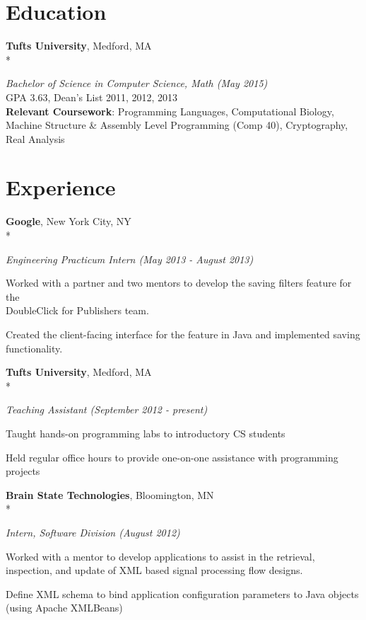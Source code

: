 \documentclass{article}
\newcommand{\position}[2]{
  \textit{#1 (#2)}
}
\newcommand{\affiliation}[2]{
  \textbf{#1}, #2 \\*
}
\newenvironment{achievements}{
  \begin{compactitem} }{
  \end{compactitem}
}
\newcommand{\skill}[2]{
  \textbf{#1}: #2
}
\begin{document}
\section*{Education}
  \affiliation{Tufts University}                             {Medford, MA}
    \position{Bachelor of Science in Computer Science, Math} {May 2015} \\
  GPA 3.63, Dean's List 2011, 2012, 2013 \\
  \skill{Relevant Coursework}
        {Programming Languages, Computational Biology, Machine Structure \&
        Assembly Level Programming (Comp 40), Cryptography, Real Analysis}

\section*{Experience}
  \affiliation{Google}                       {New York City, NY}
    \position {Engineering Practicum Intern} {May 2013 - August 2013}
    \begin{achievements}
      \item Worked with a partner and two mentors to develop the 
            saving filters feature for the \\ DoubleClick for Publishers team.
      \item Created the client-facing interface for the feature in
            Java and implemented saving \\ functionality.
    \end{achievements}
    \smallskip

  \affiliation{Tufts University}   {Medford, MA}
    \position {Teaching Assistant} {September 2012 - present}
    \begin{achievements}
      \item Taught hands-on programming labs to introductory CS students
      \item Held regular office hours to provide one-on-one assistance with
            programming projects
    \end{achievements}
    \smallskip

  \affiliation{Brain State Technologies}  {Bloomington, MN}
    \position {Intern, Software Division} {August 2012}
    \begin{achievements}
      \item Worked with a mentor to develop applications to assist in the
            retrieval, inspection, and update of XML based signal processing 
            flow designs.
      \item Define XML schema to bind application configuration parameters to 
            Java objects (using Apache XMLBeans)
    \end{achievements}
\end{document}
